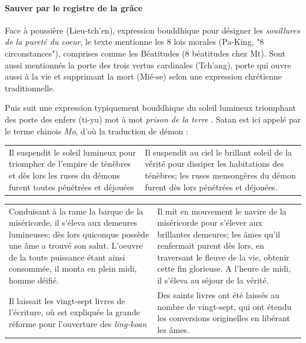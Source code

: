  \paragraph{Sauver par le registre de la grâce} Face à poussière (Lieu-tch'en), expression bouddhique pour désigner les \textit{souillures de la pureté du coeur},  le texte mentionne les 8 lois morales (Pa-King, "8 circonstances"), comprises comme les Béatitudes (8 béatitudes chez Mt).  Sont aussi mentionnés la porte des trois vertus cardinales (Tch'ang), porte qui ouvre aussi à la vie et supprimant la mort (Mié-se) selon une expression chrétienne traditionnelle. 

Puis suit une expression typiquement bouddhique du soleil lumineux triomphant des porte des enfers (ti-yu) mot à mot \textit{prison de la terre} \cite[p. 49]{Havret:stelechretienne}.  Satan est ici appelé par le terme chinois \textit{Mo}, d'où la traduction de démon :

\begin{tabular}{p{5.5cm}p{5.5cm}}
\\
Il suspendit le soleil lumineux pour triompher de l'empire de ténèbres et {dès lors }les ruses du démons furent toutes pénétrées et déjouées
&  Il suspendit au ciel le brillant soleil de la vérité pour dissiper les habitations des ténèbres; les ruses mensongères du démon furent dès lors pénétrées et déjouées. \\
\end{tabular}



 
 
 

\begin{tabular}{p{5.5cm}p{5.5cm}}
\\
Conduisant à la rame la barque de la miséricorde, il s'éleva aux demeures lumineuses; dès lors quiconque possède une âme a trouvé son salut. L'oeuvre de la toute puissance étant ainsi consommée, il monta en plein midi, homme déifié.& Il mit en mouvement le navire de la miséricorde pour s'élever aux brillantes demeures; les âmes qu'il renfermait purent dès lors, en traversant le fleuve de la vie, obtenir cette fin glorieuse. A l'heure de midi, il s'éleva au séjour de la vérité. \\ Il laissait les vingt-sept livres de l'écriture, où est expliquée la grande réforme pour l'ouverture des \textit{ling-koan}
  \cite[p. 44]{Havret:stelechretienne} & 
Des saints livres ont été laissés au nombre de vingt-sept, qui ont étendu les conversions originelles en libérant les âmes.
  \cite[p. 10]{Pauthier:linscriptionSinganfou} \\
                                                                                  
\end{tabular}
 
